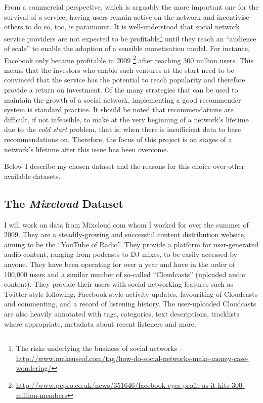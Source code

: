 From a commercial perspective, which is arguably the more important one for the 
survival of a service, having users remain active on the network and 
incentivise others to do so, too, is paramount. It is well-understood that 
social network service providers are not expected to be profitable\footnote{The 
risks underlying the business of social networks -- 
\url{http://www.makeuseof.com/tag/how-do-social-networks-make-money-case-wondering/}} 
until they reach an ``audience of scale'' to enable the adoption of a sensible 
monetisation model. For instance, Facebook only became profitable in 2009
\footnote{\url{http://www.pcpro.co.uk/news/351646/facebook-eyes-profit-as-it-hits-300-million-members}} 
after reaching 300 million users. This means that the investors who enable such 
ventures at the start need to be convinced that the service has the potential 
to reach popularity and therefore provide a return on investment. Of the many 
strategies that can be used to maintain the growth of a social network, 
implementing a good recommender system is standard practice. It should be noted 
that recommendations are difficult, if not infeasible, to make at the very 
beginning of a network's lifetime due to the \emph{cold start} problem, that 
is, when there is insufficient data to base recommendations on. Therefore, the 
focus of this project is on stages of a network's lifetime after this issue has 
been overcome.

Below I describe my chosen dataset and the reasons for this choice over other 
available datasets.

\subsection*{The \emph{Mixcloud} Dataset}

I will work on data from Mixcloud.com whom I worked for over the summer of 
2009. They are a steadily-growing and successful content distribution website, 
aiming to be the ``YouTube of Radio''. They provide a platform for 
user-generated audio content, ranging from podcasts to DJ mixes, to be easily 
accessed by anyone. They have been operating for over a year and have in the 
order of 100,000 users and a similar number of so-called ``Cloudcasts'' 
(uploaded audio content). They provide their users with social networking 
features such as Twitter-style following, Facebook-style activity updates, 
favouriting of Cloudcasts and commenting, and a record of listening history. 
The user-uploaded Cloudcasts are also heavily annotated with tags, categories, 
text descriptions, tracklists where appropriate, metadata about recent 
listeners and more. 

